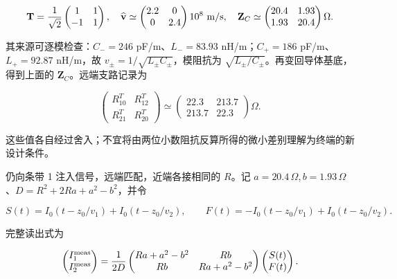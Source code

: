 \documentclass[
  11pt,
  a4paper,
  oneside,
  openany]{report}
\numberwithin{equation}{chapter}
\begin{document}
\nopagebreak[3]
\begin{equation}
\mathbf T=\frac1{\sqrt2}\begin{pmatrix}1&1\\-1&1\end{pmatrix},\quad
\widehat{\mathbf v}\simeq\begin{pmatrix}2.2&0\\0&2.4\end{pmatrix}10^8\ {\rm m/s},\quad
\mathbf Z_C\simeq\begin{pmatrix}20.4&1.93\\1.93&20.4\end{pmatrix}\Omega.
\end{equation}

其来源可逐模检查：\(C_-=246\) pF/m、\(L_-=83.93\) nH/m；\(C_+=186\)
pF/m、\(L_+=92.87\) nH/m，故 \(v_\pm=1/\sqrt{L_\pm C_\pm}\)，模阻抗为
\(\sqrt{L_\pm/C_\pm}\)。再变回导体基底，得到上面的
\(\mathbf Z_C\)。远端支路记录为

\nopagebreak[3]
\begin{equation}
\begin{pmatrix}R^T_{10}&R^T_{12}\\R^T_{21}&R^T_{20}\end{pmatrix}
\simeq\begin{pmatrix}22.3&213.7\\213.7&22.3\end{pmatrix}\Omega.
\end{equation}

这些值各自经过舍入；不宜将由两位小数阻抗反算所得的微小差别理解为终端的新设计条件。

仍向条带 1 注入信号，远端匹配，近端各接相同的 \(R\)。记
\(a=20.4\,\Omega,b=1.93\,\Omega\)、\(D=R^2+2Ra+a^2-b^2\)，并令

\nopagebreak[3]
\begin{equation}
S(t)=I_0(t-z_0/v_1)+I_0(t-z_0/v_2),\qquad
F(t)=-I_0(t-z_0/v_1)+I_0(t-z_0/v_2).
\end{equation}

完整读出式为

\nopagebreak[3]
\begin{equation}
\begin{pmatrix}I_1^{\rm meas}\\I_2^{\rm meas}\end{pmatrix}
=\frac1{2D}
\begin{pmatrix}Ra+a^2-b^2&Rb\\Rb&Ra+a^2-b^2\end{pmatrix}
\begin{pmatrix}S(t)\\F(t)\end{pmatrix}.
\end{equation}
\end{document}
